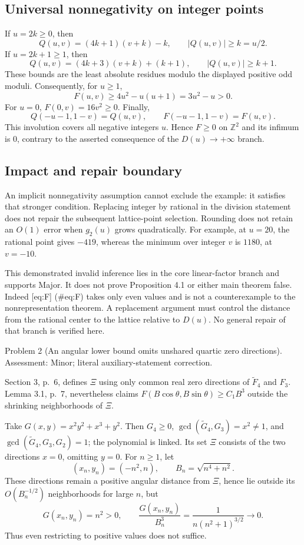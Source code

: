 \documentclass[10pt]{article}
\begin{document}
\subsection*{Universal nonnegativity on integer points}
If \(u=2k\geq0\), then \[Q(u,v)=(4k+1)(v+k)-k,\qquad |Q(u,v)|\geq k=u/2.\] If \(u=2k+1\geq1\), then \[Q(u,v)=(4k+3)(v+k)+(k+1),\qquad |Q(u,v)|\geq k+1.\] These bounds are the least absolute residues modulo the displayed positive odd moduli. Consequently, for \(u\geq1\), \[F(u,v)\geq4u^2-u(u+1)=3u^2-u>0.\] For \(u=0\), \(F(0,v)=16v^2\geq0\). Finally, \[Q(-u-1,1-v)=Q(u,v),\qquad F(-u-1,1-v)=F(u,v).\] This involution covers all negative integers \(u\). Hence \(F\geq0\) on \(\mathbb Z^2\) and its infimum is 0, contrary to the asserted consequence of the \(D(u)\to+\infty\) branch.\par
\subsection*{Impact and repair boundary}
An implicit nonnegativity assumption cannot exclude the example: it satisfies that stronger condition. Replacing integer by rational in the division statement does not repair the subsequent lattice-point selection. Rounding does not retain an \(O(1)\) error when \(g_2(u)\) grows quadratically. For example, at \(u=20\), the rational point gives \(-419\), whereas the minimum over integer \(v\) is \(1180\), at \(v=-10\).\par
This demonstrated invalid inference lies in the core linear-factor branch and supports Major. It does not prove Proposition 4.1 or either main theorem false. Indeed [eq:F] (\#eq:F) takes only even values and is not a counterexample to the nonrepresentation theorem. A replacement argument must control the distance from the rational center to the lattice relative to \(D(u)\). No general repair of that branch is verified here.\par
Problem 2 (An angular lower bound omits unshared quartic zero directions).  Assessment: Minor; literal auxiliary-statement correction.\par
Section 3, p. 6, defines \(\Xi\) using only common real zero directions of \(\widetilde F_4\) and \(F_3\). Lemma 3.1, p. 7, nevertheless claims \(F(B\cos\theta,B\sin\theta)\geq C_1B^3\) outside the shrinking neighborhoods of \(\Xi\).\par
Take \(G(x,y)=x^2y^2+x^3+y^2\). Then \(G_4\geq0\), \(\gcd(\widetilde G_4,G_3)=x^2\neq1\), and \(\gcd(\widetilde G_4,G_3,G_2)=1\); the polynomial is linked. Its set \(\Xi\) consists of the two directions \(x=0\), omitting \(y=0\). For \(n\geq1\), let \[(x_n,y_n)=(-n^2,n),\qquad B_n=\sqrt{n^4+n^2}.\] These directions remain a positive angular distance from \(\Xi\), hence lie outside its \(O(B_n^{-1/2})\) neighborhoods for large \(n\), but \[G(x_n,y_n)=n^2>0,\qquad
 \frac{G(x_n,y_n)}{B_n^3}
 =\frac1{n(n^2+1)^{3/2}}\longrightarrow0.\] Thus even restricting to positive values does not suffice.\par
\end{document}
